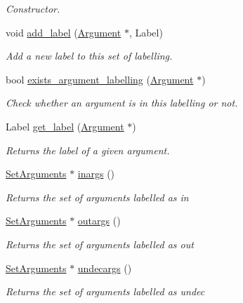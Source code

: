 \begin{DoxyCompactItemize}
\begin{DoxyCompactList}\small\item\em Constructor. \end{DoxyCompactList}\item 
void \hyperlink{classLabelling_a79e25a77b942e8395431fceceea2bb63}{add\-\_\-label} (\hyperlink{classArgument}{Argument} $\ast$, Label)
\begin{DoxyCompactList}\small\item\em Add a new label to this set of labelling. \end{DoxyCompactList}\item 
bool \hyperlink{classLabelling_a7d3ce55a661689eaa83408d4d9424117}{exists\-\_\-argument\-\_\-labelling} (\hyperlink{classArgument}{Argument} $\ast$)
\begin{DoxyCompactList}\small\item\em Check whether an argument is in this labelling or not. \end{DoxyCompactList}\item 
Label \hyperlink{classLabelling_a37bb1885f6412e0a2c66bde384413e43}{get\-\_\-label} (\hyperlink{classArgument}{Argument} $\ast$)
\begin{DoxyCompactList}\small\item\em Returns the label of a given argument. \end{DoxyCompactList}\item 
\hyperlink{classSetArguments}{Set\-Arguments} $\ast$ \hyperlink{classLabelling_af8aa0d976a665c1a9ebbdb801d0a867d}{inargs} ()
\begin{DoxyCompactList}\small\item\em Returns the set of arguments labelled as {\ttfamily in} \end{DoxyCompactList}\item 
\hyperlink{classSetArguments}{Set\-Arguments} $\ast$ \hyperlink{classLabelling_afc828a13d1a3e406f56fa1f212b4824d}{outargs} ()
\begin{DoxyCompactList}\small\item\em Returns the set of arguments labelled as {\ttfamily out} \end{DoxyCompactList}\item 
\hyperlink{classSetArguments}{Set\-Arguments} $\ast$ \hyperlink{classLabelling_aedf4e3c3b0150317e5350945f088a424}{undecargs} ()
\begin{DoxyCompactList}\small\item\em Returns the set of arguments labelled as {\ttfamily undec} \end{DoxyCompactList}\item 

\end{DoxyCompactItemize}

